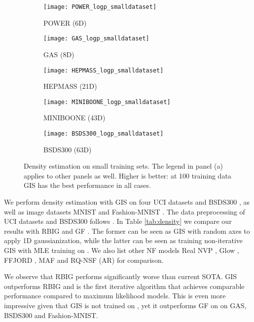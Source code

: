\documentclass{article}
\begin{document}
\begin{figure}[htb]
     \centering
     \begin{subfigure}[t]{0.49\linewidth}
         \texttt{[image: POWER\_logp\_smalldataset]}
         \caption{POWER (6D)}
     \end{subfigure}
     \begin{subfigure}[t]{0.49\linewidth}
         \texttt{[image: GAS\_logp\_smalldataset]}
         \caption{GAS (8D)}
     \end{subfigure}
     \begin{subfigure}[t]{0.49\linewidth}
         \texttt{[image: HEPMASS\_logp\_smalldataset]}
         \caption{HEPMASS (21D)}
     \end{subfigure}
     \begin{subfigure}[t]{0.49\linewidth}
         \texttt{[image: MINIBOONE\_logp\_smalldataset]}
         \caption{MINIBOONE (43D)}
     \end{subfigure}
     \begin{subfigure}[t]{0.49\linewidth}
         \texttt{[image: BSDS300\_logp\_smalldataset]}
         \caption{BSDS300 (63D)}
     \end{subfigure}
        \caption{Density estimation on small training sets. The legend in panel (a) applies to other panels as well. Higher is better: at 100 training data GIS has the best performance in all cases.
        }
        \label{fig:density}
      \vskip -0.2in
\end{figure}

We perform density estimation with GIS on four UCI datasets \citep{lichman2013uci} and BSDS300  \citep{martin2001database}, as well as image datasets MNIST \citep{lecun1998gradient} and Fashion-MNIST \citep{xiao2017online}. The data preprocessing of UCI datasets and BSDS300 follows \citet{papamakarios2017masked}. In Table \ref{tab:density} we compare our results with RBIG \citep{laparra2011iterative} and GF \citep{meng2020gaussianization}. The former can be seen as GIS with random axes to apply 1D gaussianization, while the latter can be seen as training non-iterative GIS with MLE training on . We also list other NF models Real NVP \citep{dinh2016density}, Glow \citep{kingma2018glow}, FFJORD \citep{grathwohl2018ffjord}, MAF \citep{papamakarios2017masked} and RQ-NSF (AR)\citep{durkan2019neural} for comparison. 

We observe that RBIG performs significantly worse than current SOTA. GIS outperforms RBIG and is the first iterative algorithm that achieves comparable performance compared to maximum likelihood models. This is even more impressive given that GIS is not trained on , yet it outperforms GF on  on GAS, BSDS300 and Fashion-MNIST.
\end{document}
